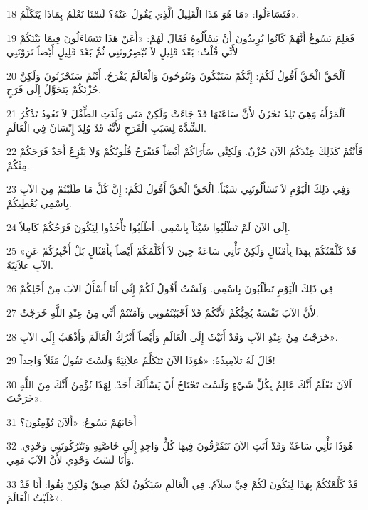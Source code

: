 \par 18 فَتَسَاءَلُوا: «مَا هُوَ هَذَا الْقَلِيلُ الَّذِي يَقُولُ عَنْهُ؟ لَسْنَا نَعْلَمُ بِمَاذَا يَتَكَلَّمُ».
\par 19 فَعَلِمَ يَسُوعُ أَنَّهُمْ كَانُوا يُرِيدُونَ أَنْ يَسْأَلُوهُ فَقَالَ لَهُمْ: «أَعَنْ هَذَا تَتَسَاءَلُونَ فِيمَا بَيْنَكُمْ لأَنِّي قُلْتُ: بَعْدَ قَلِيلٍ لاَ تُبْصِرُونَنِي ثُمَّ بَعْدَ قَلِيلٍ أَيْضاً تَرَوْنَنِي
\par 20 اَلْحَقَّ الْحَقَّ أَقُولُ لَكُمْ: إِنَّكُمْ سَتَبْكُونَ وَتَنُوحُونَ وَالْعَالَمُ يَفْرَحُ. أَنْتُمْ سَتَحْزَنُونَ وَلَكِنَّ حُزْنَكُمْ يَتَحَوَّلُ إِلَى فَرَحٍ.
\par 21 اَلْمَرْأَةُ وَهِيَ تَلِدُ تَحْزَنُ لأَنَّ سَاعَتَهَا قَدْ جَاءَتْ وَلَكِنْ مَتَى وَلَدَتِ الطِّفْلَ لاَ تَعُودُ تَذْكُرُ الشِّدَّةَ لِسَبَبِ الْفَرَحِ لأَنَّهُ قَدْ وُلِدَ إِنْسَانٌ فِي الْعَالَمِ.
\par 22 فَأَنْتُمْ كَذَلِكَ عِنْدَكُمُ الآنَ حُزْنٌ. وَلَكِنِّي سَأَرَاكُمْ أَيْضاً فَتَفْرَحُ قُلُوبُكُمْ وَلاَ يَنْزِعُ أَحَدٌ فَرَحَكُمْ مِنْكُمْ.
\par 23 وَفِي ذَلِكَ الْيَوْمِ لاَ تَسْأَلُونَنِي شَيْئاً. اَلْحَقَّ الْحَقَّ أَقُولُ لَكُمْ: إِنَّ كُلَّ مَا طَلَبْتُمْ مِنَ الآبِ بِاسْمِي يُعْطِيكُمْ.
\par 24 إِلَى الآنَ لَمْ تَطْلُبُوا شَيْئاً بِاسْمِي. اُطْلُبُوا تَأْخُذُوا لِيَكُونَ فَرَحُكُمْ كَامِلاً.
\par 25 «قَدْ كَلَّمْتُكُمْ بِهَذَا بِأَمْثَالٍ وَلَكِنْ تَأْتِي سَاعَةٌ حِينَ لاَ أُكَلِّمُكُمْ أَيْضاً بِأَمْثَالٍ بَلْ أُخْبِرُكُمْ عَنِ الآبِ علاَنِيَةً.
\par 26 فِي ذَلِكَ الْيَوْمِ تَطْلُبُونَ بِاسْمِي. وَلَسْتُ أَقُولُ لَكُمْ إِنِّي أَنَا أَسْأَلُ الآبَ مِنْ أَجْلِكُمْ
\par 27 لأَنَّ الآبَ نَفْسَهُ يُحِبُّكُمْ لأَنَّكُمْ قَدْ أَحْبَبْتُمُونِي وَآمَنْتُمْ أَنِّي مِنْ عِنْدِ اللَّهِ خَرَجْتُ.
\par 28 خَرَجْتُ مِنْ عِنْدِ الآبِ وَقَدْ أَتَيْتُ إِلَى الْعَالَمِ وَأَيْضاً أَتْرُكُ الْعَالَمَ وَأَذْهَبُ إِلَى الآبِ».
\par 29 قَالَ لَهُ تلاَمِيذُهُ: «هُوَذَا الآنَ تَتَكَلَّمُ علاَنِيَةً وَلَسْتَ تَقُولُ مَثَلاً وَاحِداً!
\par 30 اَلآنَ نَعْلَمُ أَنَّكَ عَالِمٌ بِكُلِّ شَيْءٍ وَلَسْتَ تَحْتَاجُ أَنْ يَسْأَلَكَ أَحَدٌ. لِهَذَا نُؤْمِنُ أَنَّكَ مِنَ اللَّهِ خَرَجْتَ».
\par 31 أَجَابَهُمْ يَسُوعُ: «أَلآنَ تُؤْمِنُونَ؟
\par 32 هُوَذَا تَأْتِي سَاعَةٌ وَقَدْ أَتَتِ الآنَ تَتَفَرَّقُونَ فِيهَا كُلُّ وَاحِدٍ إِلَى خَاصَّتِهِ وَتَتْرُكُونَنِي وَحْدِي. وَأَنَا لَسْتُ وَحْدِي لأَنَّ الآبَ مَعِي.
\par 33 قَدْ كَلَّمْتُكُمْ بِهَذَا لِيَكُونَ لَكُمْ فِيَّ سلاَمٌ. فِي الْعَالَمِ سَيَكُونُ لَكُمْ ضِيقٌ وَلَكِنْ ثِقُوا: أَنَا قَدْ غَلَبْتُ الْعَالَمَ».

